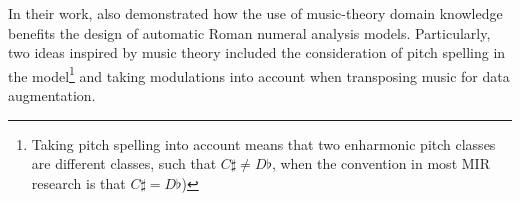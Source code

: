 

In their work, \textcite{micchi2020not} also demonstrated
how the use of music-theory domain knowledge benefits the
design of automatic Roman numeral analysis models.
Particularly, two ideas inspired by music theory included
the consideration of pitch spelling in the
model\footnote{Taking pitch spelling into account means that
two enharmonic pitch classes are different classes, such
that $C\sharp \neq D\flat$, when the convention in most MIR
research is that $C\sharp = D\flat$)} and taking modulations
into account when transposing music for data augmentation.
